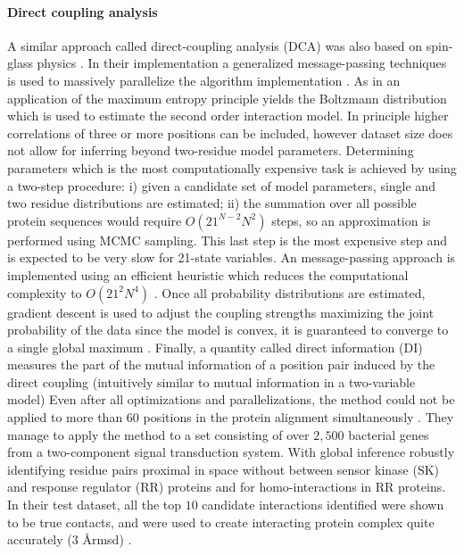 \paragraph{Direct coupling analysis}
A similar approach called  direct-coupling analysis (DCA) was also based on spin-glass physics \cite{weigt2009identification}.
In their implementation a generalized message-passing techniques is used to massively parallelize the algorithm implementation \cite{weigt2009identification}.
As in \cite{lapedes2012using} an application of the maximum entropy principle yields the Boltzmann distribution which is used to estimate the second order interaction model.
In principle higher correlations of three or more positions can be included, however dataset size does not allow for inferring beyond \cite{weigt2009identification} two-residue model parameters. 
Determining parameters which is the most computationally expensive task is achieved by using a two-step procedure: i) given a candidate set of model parameters, single and two residue distributions are estimated; ii) the summation over all possible protein sequences would require $O(21^{N-2} N^2)$ steps, so an approximation is performed using MCMC sampling. 
This last step is the most expensive step and is expected to be very slow for 21-state variables.
An message-passing approach is implemented using an efficient heuristic which reduces the computational complexity to $O(21^2 N^4)$ \cite{weigt2009identification}.
Once all probability distributions are estimated, gradient descent is used to adjust the coupling strengths maximizing the joint probability of the data since the model is convex, it is guaranteed to converge to a single global maximum \cite{weigt2009identification}.
Finally, a quantity called direct information (DI) measures the part of the mutual information of a position pair induced by the direct coupling (intuitively similar to mutual information in a two-variable model) \cite{weigt2009identification}
Even after all optimizations and parallelizations, the method could not be applied to more than $60$ positions in the protein alignment simultaneously \cite{weigt2009identification}.
They manage to apply the method to a set consisting of over $2,500$ bacterial genes from a two-component signal transduction system.
With global inference robustly identifying residue pairs proximal in space without between sensor kinase (SK) and response regulator (RR) proteins and for homo-interactions in RR proteins. \cite{weigt2009identification}
In their test dataset, all the top $10$ candidate interactions identified were shown to be true contacts, and were used to create interacting protein complex quite accurately ($3$ \AA  rmsd) \cite{morcos2011direct}.

